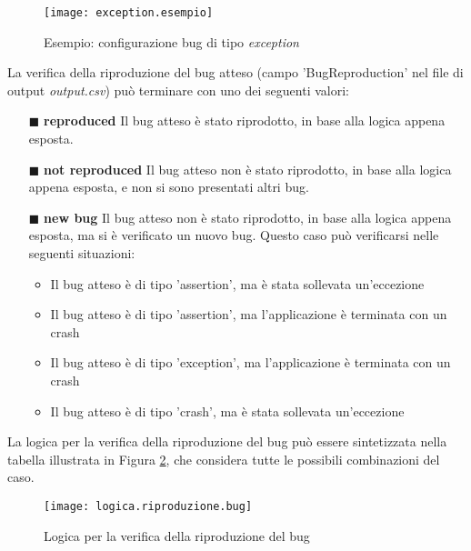 \begin{figure}[H]
	\texttt{[image: exception.esempio]}
	\centering
	\caption{Esempio: configurazione bug di tipo \emph{exception}}
    \label{fig:exc.es}
\end{figure}
\noindent
La verifica della riproduzione del bug atteso (campo 'BugReproduction' nel file di output \emph{output.csv}) può terminare con uno dei seguenti valori:
\begin{itemize} [nosep]
\item [$\blacksquare$] \textbf{reproduced} \newline
Il bug atteso è stato riprodotto, in base alla logica appena esposta.
\item [$\blacksquare$] \textbf{not reproduced}\newline
Il bug atteso non è stato riprodotto, in base alla logica appena esposta, e non si sono presentati altri bug.
\item [$\blacksquare$] \textbf{new bug}\newline
Il bug atteso non è stato riprodotto, in base alla logica appena esposta, ma si è verificato un nuovo bug. Questo caso può verificarsi nelle seguenti situazioni:
\begin{itemize}
\item Il bug atteso è di tipo 'assertion', ma è stata sollevata un'eccezione 
\item Il bug atteso è di tipo 'assertion', ma l'applicazione è terminata con un crash
\item Il bug atteso è di tipo 'exception', ma l'applicazione è terminata con un crash
\item Il bug atteso è di tipo 'crash', ma è stata sollevata un'eccezione
\end{itemize}
\end{itemize}

\newpage %
\noindent La logica per la verifica della riproduzione del bug può essere sintetizzata nella tabella illustrata in Figura \ref{fig:logbug}, che considera tutte le possibili combinazioni del caso.

\begin{figure}[H]
	\texttt{[image: logica.riproduzione.bug]}
	\centering
	\caption{Logica per la verifica della riproduzione del bug}
    \label{fig:logbug}
\end{figure}

